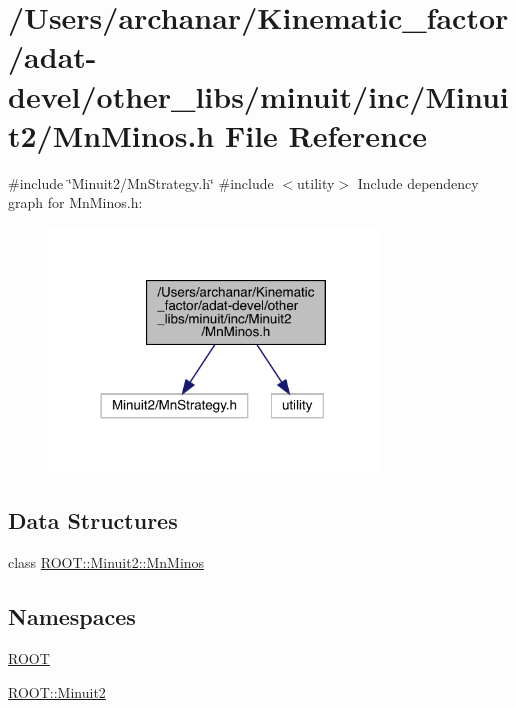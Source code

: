 \hypertarget{adat-devel_2other__libs_2minuit_2inc_2Minuit2_2MnMinos_8h}{}\section{/\+Users/archanar/\+Kinematic\+\_\+factor/adat-\/devel/other\+\_\+libs/minuit/inc/\+Minuit2/\+Mn\+Minos.h File Reference}
\label{adat-devel_2other__libs_2minuit_2inc_2Minuit2_2MnMinos_8h}
{\ttfamily \#include \char`\"{}Minuit2/\+Mn\+Strategy.\+h\char`\"{}}\newline
{\ttfamily \#include $<$utility$>$}\newline
Include dependency graph for Mn\+Minos.\+h\+:
\nopagebreak
\begin{figure}[H]
\begin{center}
\leavevmode
\includegraphics[width=248pt]{df/d8a/adat-devel_2other__libs_2minuit_2inc_2Minuit2_2MnMinos_8h__incl}
\end{center}
\end{figure}
\subsection*{Data Structures}
\begin{DoxyCompactItemize}
\item 
class \mbox{\hyperlink{classROOT_1_1Minuit2_1_1MnMinos}{R\+O\+O\+T\+::\+Minuit2\+::\+Mn\+Minos}}
\end{DoxyCompactItemize}
\subsection*{Namespaces}
\begin{DoxyCompactItemize}
\item 
 \mbox{\hyperlink{namespaceROOT}{R\+O\+OT}}
\item 
 \mbox{\hyperlink{namespaceROOT_1_1Minuit2}{R\+O\+O\+T\+::\+Minuit2}}
\end{DoxyCompactItemize}

